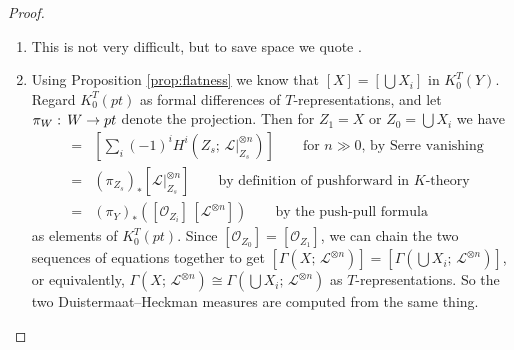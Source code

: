 \documentclass[10pt,a4paper]{amsart}
\newcommand{\AK}[1]{\textcolor{darkgreen}{[AK: #1]}}
\DeclareMathOperator{\wt}{wt}
\newcommand{\RR}{\mathbb{R}}
\newcommand{\PP}{\mathbb{P}}
\newcommand\Union\bigcup
\newcommand\lie[1]{{\mathfrak #1}}
\newcommand\FF{{\mathbb F}}
\newcommand\tensor\otimes
\newcommand\calO{{\mathcal O}}
\newcommand\calL{{\mathcal L}}
\newcommand\into\hookrightarrow
\newcommand\onto\twoheadrightarrow
\newcommand\iso\cong
\newcommand\junk[1]{}
\newcommand\actson\circlearrowright
\renewcommand{\colon}{\mathrel{:}}
\renewcommand{\colon}{:\mkern\thinmuskip}
\begin{document}
\begin{proof}
\begin{enumerate}
{    \AK{Should cut this down using Lemma \ref{lem:fixedPoints}}
    It remains to show that if $T$ acts faithfully, then
    $\dim_\RR \Phi_T(X,\calL) = \dim T$. Obviously we have $\leq$ because
    $\Phi_T(X,\calL) \subseteq \lie t_\RR^*$. If the dimension is strictly less,
    then $\Phi_T(X,\calL)$ is contained in some rational affine hyperplane
    $H \leq \lie t_\RR^*$, perpendicular to a subtorus $S \into T$ of
    dimension $1$.
    \junk{Using the $\tensor \FF_\lambda$ trick above we can assume that $H \ni \vec 0$}
    So $S$ acts with the same weight on every line $\calL_p$ over a
    $T$-fixed point. Since the action is assumed faithful for $T$, hence
    faithful for $S$, there exists $x \in X$ a non-fixed point.

    Assume briefly that the curve $\Sigma := \overline{S\cdot x}$ is normal, in which
    case it is a $\PP^1$ (no higher genus curve possesses a faithful $S$-action).
    Since $\calL$ is ample on this $\PP^1$, it is $\calO(j)$ for some $j\neq 0$
    (in fact $j>0$).
    Let $\mu = \wt(S\actson T_0 \Sigma)$, which is not $\vec 0$ because
    $S$ acts faithfully on $\Sigma$,
    and perform the fundamental calculation
    $\wt(T\actson T_\infty \Sigma)-\wt(T\actson T_0 \Sigma) = j \mu \neq \vec 0$.
    This contradicts the statement above that $S$ acts with the same weight
    on each $\calL_p$. 

    If $\overline{S\cdot x}$ is not normal, then take $\Sigma$ instead to
    be its normalization $\Sigma \onto \overline{S\cdot x}$ and run the
    same argument.
    }
  \item This is not very difficult, but to save space we quote
    \cite[Theorem 9.8]{baumann2021mirkovic}.
  \item \label{item:Kproof}
    Using Proposition \ref{prop:flatness} we know
    that $[X] = [\Union X_i]$ in $K_0^T(Y)$. Regard $K_0^T(pt)$ as formal
    differences of $T$-representations, and let $\pi_W\colon W\to pt$
    denote the projection. Then for $Z_1 = X$ or $Z_0 = \Union X_i$ we have
    \begin{eqnarray*}
      [\Gamma(Z_s;\, \calL^{\tensor n})]
      &=& \left[ \sum_i (-1)^i H^i(Z_s;\, \calL|_{Z_s}^{\tensor n})\right]
          \qquad\text{for $n\gg 0$, by Serre vanishing} \\
      &=& (\pi_{Z_s})_* [\calL|_{Z_s}^{\tensor n}]
          \qquad\text{by definition of pushforward in $K$-theory} \\
      &=& (\pi_Y)_*\left( [\calO_{Z_i}]\, [\calL^{\tensor n}] \right)
          \qquad\text{by the push-pull formula} 
    \end{eqnarray*}
    as elements of $K_0^T(pt)$. Since $[\calO_{Z_0}] = [\calO_{Z_1}]$,
    we can chain the two sequences of equations together to get
    $[\Gamma(X;\, \calL^{\tensor n})] = [\Gamma(\Union X_i;\, \calL^{\tensor n})]$,
    or equivalently,
    $\Gamma(X;\, \calL^{\tensor n}) \iso \Gamma(\Union X_i;\, \calL^{\tensor n})$
    as $T$-representations. So the two Duistermaat--Heckman measures
    are computed from the same thing.


\end{enumerate}
\end{proof}
\end{document}
